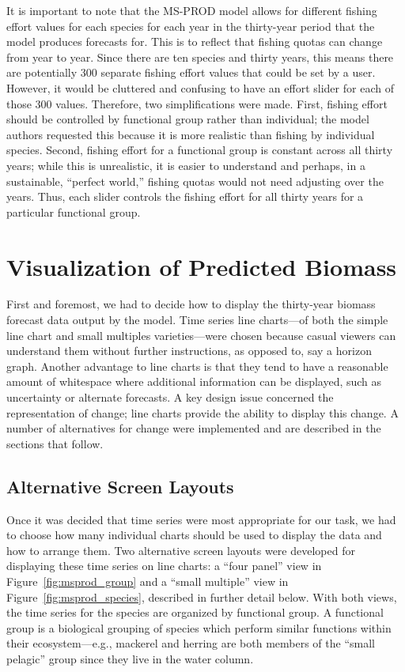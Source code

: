 It is important to note that the MS-PROD model allows for different fishing effort values for each species for each year in the thirty-year period that the model produces forecasts for.  This is to reflect that fishing quotas can change from year to year.  Since there are ten species and thirty years, this means there are potentially 300 separate fishing effort values that could be set by a user.  However, it would be cluttered and confusing to have an effort slider for each of those 300 values.  Therefore, two simplifications were made.  First, fishing effort should be controlled by functional group rather than individual; the model authors requested this because it is more realistic than fishing by individual species.  Second, fishing effort for a functional group is constant across all thirty years; while this is unrealistic, it is easier to understand and perhaps, in a sustainable, ``perfect world,'' fishing quotas would not need adjusting over the years.  Thus, each slider controls the fishing effort for all thirty years for a particular functional group.

\section{Visualization of Predicted Biomass}

First and foremost, we had to decide how to display the thirty-year biomass forecast data output by the model.  Time series line charts---of both the simple line chart and small multiples varieties---were chosen because casual viewers can understand them without further instructions, as opposed to, say a horizon graph.  Another advantage to line charts is that they tend to have a reasonable amount of whitespace where additional information can be displayed, such as uncertainty or alternate forecasts. A key design issue concerned the representation of change; line charts provide the ability to display this change.  A number of alternatives for change were implemented and are described in the sections that follow.

\subsection{Alternative Screen Layouts}

Once it was decided that time series were most appropriate for our task, we had to choose how many individual charts should be used to display the data and how to arrange them.  Two alternative screen layouts were developed for displaying these time series on line charts: a ``four panel'' view in Figure~\ref{fig:msprod_group} and a ``small multiple'' view in Figure~\ref{fig:msprod_species}, described in further detail below.  With both views, the time series for the species are organized by functional group.  A functional group is a biological grouping of species which perform similar functions within their ecosystem---e.g., mackerel and herring are both members of the ``small pelagic'' group since they live in the water column.


